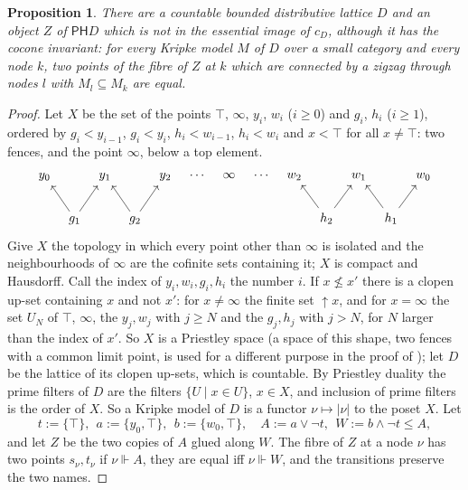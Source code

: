 \documentclass[11pt]{amsart}
\newtheorem{prop}[thm]{Proposition}
\theoremstyle{definition}
\newcommand{\PP}{\mathsf P}
\newcommand{\HH}{\mathsf H}
\begin{document}
\begin{prop}\label{prop:infinite}
There are a countable bounded distributive lattice $D$ and an object
$Z$ of $\PP\HH D$ which is not in the essential image of $c_D$,
although it has the cocone invariant: for every Kripke model $M$ of $D$
over a small category and every node $k$, two points of the fibre of
$Z$ at $k$ which are connected by a zigzag through nodes $l$ with
$M_l\subseteq M_k$ are equal.
\end{prop}
\begin{proof}
Let $X$ be the set of the points $\top$, $\infty$, $y_i$, $w_i$
($i\ge0$) and $g_i$, $h_i$ ($i\ge1$), ordered by $g_i<y_{i-1}$,
$g_i<y_i$, $h_i<w_{i-1}$, $h_i<w_i$ and $x<\top$ for all $x\ne\top$:
two fences, and the point $\infty$, below a top element.
\[
\begin{tikzcd}[column sep=tiny]
y_0&&y_1&&y_2&\cdots&\infty&\cdots&w_2&&w_1&&w_0\\
&g_1\arrow[ul]\arrow[ur]&&g_2\arrow[ul]\arrow[ur]&&&&&&h_2\arrow[ul]
\arrow[ur]&&h_1\arrow[ul]\arrow[ur]&
\end{tikzcd}
\]
Give $X$ the topology in which every point other than $\infty$ is
isolated and the neighbourhoods of $\infty$ are the cofinite sets
containing it; $X$ is compact and Hausdorff. Call the index of
$y_i,w_i,g_i,h_i$ the number $i$. If $x\not\le x'$ there is a clopen
up-set containing $x$ and not $x'$: for $x\ne\infty$ the finite set
$\uparrow\!x$, and for $x=\infty$ the set $U_N$ of $\top$, $\infty$,
the $y_j,w_j$ with $j\ge N$ and the $g_j,h_j$ with $j>N$, for $N$
larger than the index of $x'$. So $X$ is a Priestley space (a space of this shape, two fences with a
common limit point, is used for a different purpose in the proof of
\cite[Thm.~4.12]{BHIL18}); let $D$ be
the lattice of its clopen up-sets, which is countable. By Priestley
duality the prime filters of $D$ are the filters $\{U\mid x\in U\}$,
$x\in X$, and inclusion of prime filters is the order of $X$. So a
Kripke model of $D$ is a functor $\nu\mapsto|\nu|$ to the poset $X$.
Let
\[
t:=\{\top\},\ \ a:=\{y_0,\top\},\ \ b:=\{w_0,\top\},\quad
A:=a\vee\neg t,\ \ W:=b\wedge\neg t\le A,
\]
and let $Z$ be the two copies of $A$ glued along $W$. The fibre of $Z$
at a node $\nu$ has two points $s_\nu,t_\nu$ if $\nu\Vdash A$, they are
equal iff $\nu\Vdash W$, and the transitions preserve the two names.


\end{proof}
\end{document}
